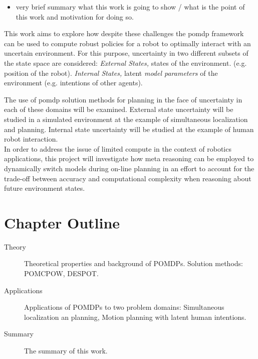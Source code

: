 \begin{itemize}
  \item very brief summary what this work is going to show / what is the point
        of this work and motivation for doing so.
\end{itemize}

This work aims to explore how despite these challenges the \ac{pomdp} framework
can be used to compute robust policies for a robot to optimally interact with
an uncertain environment. For this purpose, uncertainty in two different
subsets of the state space are considered: \emph{External States,}  states of
the environment. (e.g. position of the robot). \emph{Internal States,} latent
\emph{model parameters} of the environment (e.g. intentions of other agents).

The use of \ac{pomdp} solution methods for planning in the face of uncertainty in
each of these domains will be examined. External state uncertainty will be
studied in a simulated environment at the example of simultaneous localization
and planning. Internal state uncertainty will be studied at the example of
human robot interaction.\\
In order to address the issue of limited compute in the context of robotics
applications, this project will investigate how meta reasoning can be employed to
dynamically switch models during on-line planning in an effort to account for
the trade-off between accuracy and computational complexity when reasoning about
future environment states.

\section{Chapter Outline}


\begin{description}
  \item[Theory] Theoretical properties and background of POMDPs. Solution methods: POMCPOW, DESPOT.
  \item[Applications] Applications of POMDPs to two problem domains: Simultaneous localization an planning, Motion planning with latent human intentions.
  \item[Summary] The summary of this work.
\end{description}
